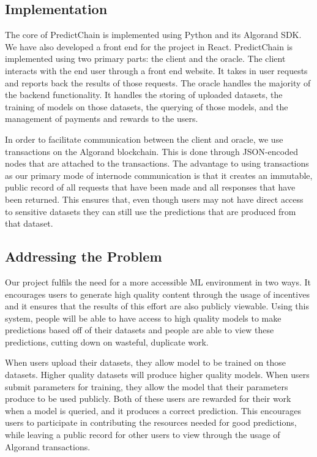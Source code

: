 \documentclass{article}
\begin{document}
    \subsection{Implementation}

    The core of PredictChain is implemented using Python and its Algorand SDK.  We have also developed a front end for the
    project in React.  PredictChain is implemented using two primary parts: the client and the oracle.  The client interacts
    with the end user through a front end website.  It takes in user requests and reports back the results of those requests.
    The oracle handles the majority of the backend functionality.  It handles the storing of uploaded datasets, the
    training of models on those datasets, the querying of those models, and the management of payments and rewards to the users.

    In order to facilitate communication between the client and oracle, we use transactions on the Algorand blockchain.
    This is done through JSON-encoded nodes that are attached to the transactions.  The advantage to using transactions as
    our primary mode of internode communication is that it creates an immutable, public record of all requests that
    have been made and all responses that have been returned.  This ensures that, even though users may not have direct
    access to sensitive datasets they can still use the predictions that are produced from that dataset.

    \subsection{Addressing the Problem}

    Our project fulfils the need for a more accessible ML environment in two ways.  It encourages users to generate high
    quality content through the usage of incentives and it ensures that the results of this effort are also publicly
    viewable.  Using this system, people will be able to have access to high quality models to make predictions based
    off of their datasets and people are able to view these predictions, cutting down on wasteful, duplicate work.

    When users upload their datasets, they allow model to be trained on those datasets.  Higher quality datasets will
    produce higher quality models. When users submit parameters for training, they allow the model that their parameters
    produce to be used publicly.  Both of these users are rewarded for their work when a model is queried, and it produces
    a correct prediction.  This encourages users to participate in contributing the resources needed for good predictions,
    while leaving a public record for other users to view through the usage of Algorand transactions.
\end{document}
